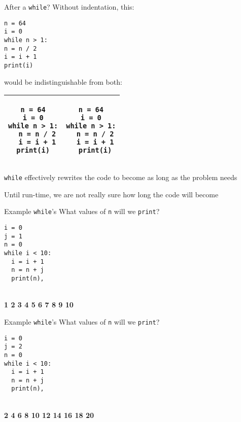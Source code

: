 \documentclass{beamer}
\begin{document}
\begin{frame}[fragile]{After a \texttt{while}?}
Without indentation, this:
\begin{lstlisting}[frame=shadowbox,basicstyle=\ttfamily\tiny]
n = 64
i = 0
while n > 1:
n = n / 2
i = i + 1
print(i)
\end{lstlisting}

would be indistinguishable from both:

\begin{tabular}{| c | c |}
\hline
\begin{lstlisting}[basicstyle=\ttfamily\tiny]
n = 64
i = 0
while n > 1:
  n = n / 2
  i = i + 1
print(i)
\end{lstlisting}
&
\begin{lstlisting}[basicstyle=\ttfamily\tiny]
n = 64
i = 0
while n > 1:
  n = n / 2
  i = i + 1
  print(i)
\end{lstlisting} \\
\hline
\end{tabular}
\end{frame}

\begin{slide}{
\item \texttt{while} effectively rewrites the code to become as long as the problem needs
\item Until run-time, we are not really sure how long the code will become
}\end{slide}

\begin{frame}[fragile]{Example \texttt{while}'s}
What values of \texttt{n} will we \texttt{print}?
\begin{lstlisting}[frame=shadowbox,basicstyle=\ttfamily\tiny]
i = 0
j = 1
n = 0
while i < 10:
  i = i + 1
  n = n + j
  print(n),
\end{lstlisting}

\pause

\ \\

\textbf{1 2 3 4 5 6 7 8 9 10}
\end{frame}

\begin{frame}[fragile]{Example \texttt{while}'s}
What values of \texttt{n} will we \texttt{print}?
\begin{lstlisting}[frame=shadowbox,basicstyle=\ttfamily\tiny]
i = 0
j = 2
n = 0
while i < 10:
  i = i + 1
  n = n + j
  print(n),
\end{lstlisting}

\pause

\ \\

\textbf{2 4 6 8 10 12 14 16 18 20}
\end{frame}
\end{document}
